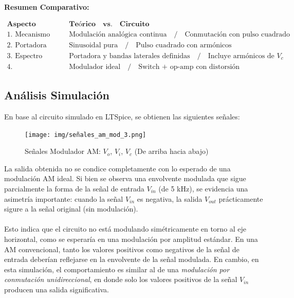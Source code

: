 \vspace{1em}

\noindent \textbf{Resumen Comparativo:}

\begin{equation*}
    \boxed{
        \begin{array}{ll}
            \textbf{Aspecto}         & \textbf{Teórico} \quad \textbf{vs.} \quad \textbf{Circuito}                                  \\
            \hline
            \text{1. Mecanismo}      & \text{Modulación analógica continua} \quad / \quad \text{Conmutación con pulso cuadrado}     \\
            \text{2. Portadora}      & \text{Sinusoidal pura} \quad / \quad \text{Pulso cuadrado con armónicos}                     \\
            \text{3. Espectro}       & \text{Portadora y bandas laterales definidas} \quad / \quad \text{Incluye armónicos de } V_c \\
            \text{4. Implementación} & \text{Modulador ideal} \quad / \quad \text{Switch + op-amp con distorsión}
        \end{array}
    }
\end{equation*}

\subsection{Análisis Simulación}

En base al circuito simulado en LTSpice, se obtienen las siguientes señales:

\begin{figure}[htbp]
    \centering
    \texttt{[image: img/señales\_am\_mod\_3.png]}
    \caption{Señales Modulador AM: $V_o$, $V_i$, $V_c$ (De arriba hacia abajo)}
    \label{fig:am_signal_3}
\end{figure}

La salida obtenida no se condice completamente con lo esperado de una modulación AM ideal. Si bien se observa una envolvente modulada que sigue parcialmente la forma de la señal de entrada $V_{in}$ (de 5 kHz), se evidencia una asimetría importante: cuando la señal $V_{in}$ es negativa, la salida $V_{out}$ prácticamente sigure a la señal original (sin modulación).

\paragraph{} Esto indica que el circuito no está modulando simétricamente en torno al eje horizontal, como se esperaría en una modulación por amplitud estándar. En una AM convencional, tanto los valores positivos como negativos de la señal de entrada deberían reflejarse en la envolvente de la señal modulada. En cambio, en esta simulación, el comportamiento es similar al de una \textit{modulación por conmutación unidireccional}, en donde solo los valores positivos de la señal $V_{in}$ producen una salida significativa.

